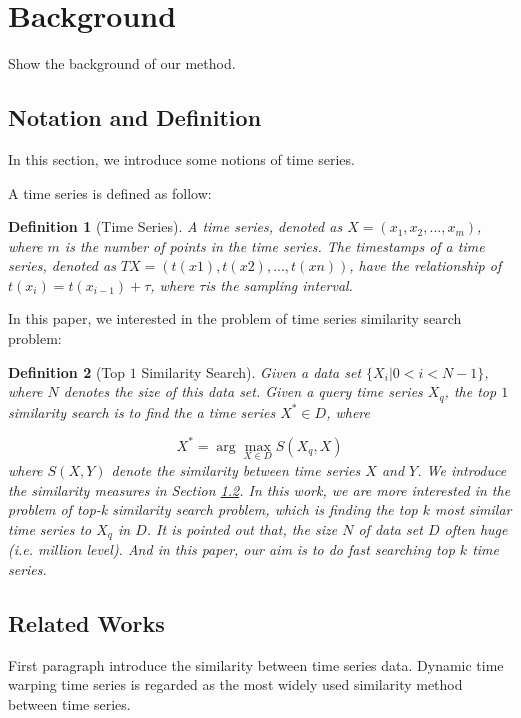 \documentclass{article}
\newtheorem{definition}{Definition}
\begin{document}
\section{Background}
Show the background of our method.

\subsection{Notation and Definition}

In this section, we introduce some notions of time series. 

A time series is defined as follow:
\begin{definition}[Time Series]
A time series, denoted as $X = (x_1,x_2,...,x_m)$, where $m$ is the number of points in the time series. The timestamps of a time series, denoted as $TX = (t(x1), t(x2),..., t(xn))$, have the relationship of $t(x_i) = t(x_{i-1})+\tau$, where $\tau$is the sampling interval.
\end{definition}

In this paper, we interested in the problem of time series similarity search problem:
\begin{definition}[Top $1$ Similarity Search]
Given a data set $\{X_i|0<i<N-1\}$, where $N$ denotes the size of this data set. Given a query time series $X_q$, the top $1$ similarity search is to find the a time series $X^* \in D$, where

\[
X^* = \arg \max_{X \in D} S(X_q,X)
\]
where $S(X,Y)$ denote the similarity between time series $X$ and $Y$. We introduce the similarity measures in Section \ref{relatedwork}. In this work, we are more interested in the problem of top-k similarity search problem, which is finding the top $k$ most similar time series to $X_q$ in $D$. It is pointed out that, the size $N$ of data set $D$ often huge (i.e. million level). And in this paper, our aim is to do fast searching top $k$ time series.

\end{definition}

\subsection{Related Works}
\label{relatedwork}

First paragraph introduce the similarity between time series data.
Dynamic time warping \cite{rakthanmanon2012searching} time series is regarded as the most widely used similarity method between time series. 
\end{document}
